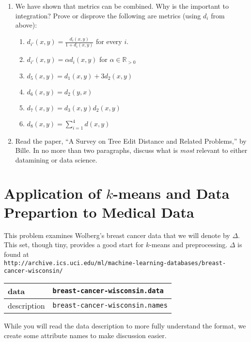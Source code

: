 \documentclass{article}
\begin{document}
\begin{enumerate}
\item We have shown that metrics can be combined.  Why is the important to integration? Prove or disprove the following are metrics (using $d_i$ from above):
\begin{enumerate}
\item $d_{i'}(x,y) = \frac{d_i(x,y)}{1 + d_i(x,y)}$ for every $i$.
\item $d_{i'}(x,y) = \alpha d_i(x,y)$ for $\alpha\in\mathbb{R}_{>0}$ 
\item $d_5(x,y) = d_1(x,y) + 3d_2(x,y)$
\item $d_6(x,y) = d_2(y,x)$
\item $d_7(x,y) = d_3(x,y)d_2(x,y)$
\item $d_8(x,y) = \sum_{i=1}^{4}d(x,y)$
\end{enumerate}
\item Read the paper, ``A Survey on Tree Edit Distance and Related Problems,'' by Bille\cite{Bille:2005:STE:1085274.1085283}.  In no more than two paragraphs, discuss what is {\it most} relevant to either datamining or data science.
\end{enumerate}







\section*{Application of $k$-means and Data Prepartion to Medical Data}

 This problem examines Wolberg's breast cancer data\cite{WMbreast90} that we will denote by $\Delta$. This set, though tiny, provides a good start for $k$-means and preprocessing. $\Delta$ is found at\\
  {\texttt {http://archive.ics.uci.edu/ml/machine-learning-databases/breast-cancer-wisconsin/}}\\
  
  \begin{tabular}[h]{l||l}
data & {\texttt{breast-cancer-wisconsin.data}}\\ \hline 
description &  {\texttt{breast-cancer-wisconsin.names}}  
\end{tabular}

While you will read the data description to more fully understand the format, we create some attribute names to make discussion easier.
\end{document}
